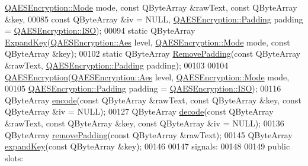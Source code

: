 \begin{DoxyCode}
      \hyperlink{class_q_a_e_s_encryption_ad3e031c49a3d56566379d75b40b7b255}{QAESEncryption::Mode} mode, \textcolor{keyword}{const} QByteArray &rawText, \textcolor{keyword}{const} QByteArray &key,
00085                               \textcolor{keyword}{const} QByteArray &iv = NULL, 
      \hyperlink{class_q_a_e_s_encryption_ab0a65cdea4eac21ef32530010d1b0247}{QAESEncryption::Padding} padding = \hyperlink{class_q_a_e_s_encryption_ab0a65cdea4eac21ef32530010d1b0247a4fb686e6a16d4242ff35311d2e7c422d}{QAESEncryption::ISO});
00094     \textcolor{keyword}{static} QByteArray \hyperlink{class_q_a_e_s_encryption_a2112456e057e6dd886694348fbf202cd}{ExpandKey}(\hyperlink{class_q_a_e_s_encryption_abe48208f4f6c7d68e6a10b49b9d0b7bd}{QAESEncryption::Aes} level, 
      \hyperlink{class_q_a_e_s_encryption_ad3e031c49a3d56566379d75b40b7b255}{QAESEncryption::Mode} mode, \textcolor{keyword}{const} QByteArray &key);
00102     \textcolor{keyword}{static} QByteArray \hyperlink{class_q_a_e_s_encryption_abb2887bf5623a74053dd19627f3d3055}{RemovePadding}(\textcolor{keyword}{const} QByteArray &rawText, 
      \hyperlink{class_q_a_e_s_encryption_ab0a65cdea4eac21ef32530010d1b0247}{QAESEncryption::Padding} padding);
00103 
00104     \hyperlink{class_q_a_e_s_encryption_aeac0ee8532e69e5d30b023fe38c30b3b}{QAESEncryption}(\hyperlink{class_q_a_e_s_encryption_abe48208f4f6c7d68e6a10b49b9d0b7bd}{QAESEncryption::Aes} level, 
      \hyperlink{class_q_a_e_s_encryption_ad3e031c49a3d56566379d75b40b7b255}{QAESEncryption::Mode} mode,
00105                    \hyperlink{class_q_a_e_s_encryption_ab0a65cdea4eac21ef32530010d1b0247}{QAESEncryption::Padding} padding = 
      \hyperlink{class_q_a_e_s_encryption_ab0a65cdea4eac21ef32530010d1b0247a4fb686e6a16d4242ff35311d2e7c422d}{QAESEncryption::ISO});
00116     QByteArray \hyperlink{class_q_a_e_s_encryption_a0c56eddd6f03e93b1f7faad464044d65}{encode}(\textcolor{keyword}{const} QByteArray &rawText, \textcolor{keyword}{const} QByteArray &key, \textcolor{keyword}{const} QByteArray &iv = NULL);
00127     QByteArray \hyperlink{class_q_a_e_s_encryption_a58f972f2b66c2454edd5112495463bba}{decode}(\textcolor{keyword}{const} QByteArray &rawText, \textcolor{keyword}{const} QByteArray &key, \textcolor{keyword}{const} QByteArray &iv = NULL);
00136     QByteArray \hyperlink{class_q_a_e_s_encryption_a4dc7e77485e5a3e63eebc99b9386c17b}{removePadding}(\textcolor{keyword}{const} QByteArray &rawText);
00145     QByteArray \hyperlink{class_q_a_e_s_encryption_a5bfbb972f84a8376fceed648553c0912}{expandKey}(\textcolor{keyword}{const} QByteArray &key);
00146 
00147 signals:
00148 
00149 \textcolor{keyword}{public} slots:

\end{DoxyCode}
